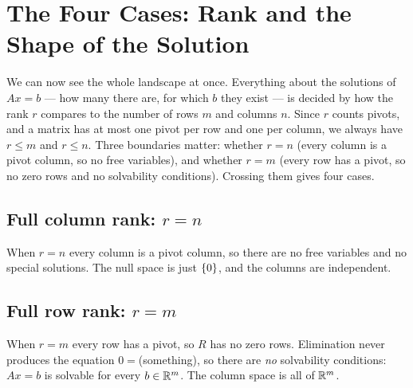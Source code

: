 \section{The Four Cases: Rank and the Shape of the Solution}

We can now see the whole landscape at once. Everything about the solutions of $Ax=b$ --- how many there are, for which $b$ they exist --- is decided by how the rank $r$ compares to the number of rows $m$ and columns $n$. Since $r$ counts pivots, and a matrix has at most one pivot per row and one per column, we always have $r\le m$ and $r\le n$. Three boundaries matter: whether $r=n$ (every column is a pivot column, so no free variables), and whether $r=m$ (every row has a pivot, so no zero rows and no solvability conditions). Crossing them gives four cases.

\subsection{Full column rank: \texorpdfstring{$r=n$}{r=n}}

When $r=n$ every column is a pivot column, so there are no free variables and no special solutions. The null space is just $\left\{0\right\}$, and the columns are independent.


\subsection{Full row rank: \texorpdfstring{$r=m$}{r=m}}

When $r=m$ every row has a pivot, so $R$ has no zero rows. Elimination never produces the equation $0=$(something), so there are \emph{no} solvability conditions: $Ax=b$ is solvable for every $b\in\mathbb{R}^m$. The column space is all of $\mathbb{R}^m$.

